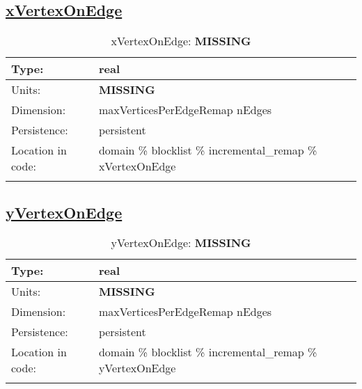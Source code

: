 \subsection[xVertexOnEdge]{\hyperref[sec:var_tab_incremental_remap]{xVertexOnEdge}}
\label{subsec:var_sec_incremental_remap_xVertexOnEdge}
\begin{center}
\begin{longtable}{| p{2.0in} | p{4.0in} |}
        \hline 
        Type: & real \\
        \hline 
        Units: & {\bf \color{red} MISSING} \\
        \hline 
        Dimension: & maxVerticesPerEdgeRemap nEdges \\
        \hline 
        Persistence: & persistent \\
        \hline 
         Location in code: & domain \% blocklist \% incremental\_remap \% xVertexOnEdge \\
         \hline 
    \caption{xVertexOnEdge: {\bf \color{red} MISSING}}
\end{longtable}
\end{center}
\subsection[yVertexOnEdge]{\hyperref[sec:var_tab_incremental_remap]{yVertexOnEdge}}
\label{subsec:var_sec_incremental_remap_yVertexOnEdge}
\begin{center}
\begin{longtable}{| p{2.0in} | p{4.0in} |}
        \hline 
        Type: & real \\
        \hline 
        Units: & {\bf \color{red} MISSING} \\
        \hline 
        Dimension: & maxVerticesPerEdgeRemap nEdges \\
        \hline 
        Persistence: & persistent \\
        \hline 
         Location in code: & domain \% blocklist \% incremental\_remap \% yVertexOnEdge \\
         \hline 
    \caption{yVertexOnEdge: {\bf \color{red} MISSING}}
\end{longtable}
\end{center}
